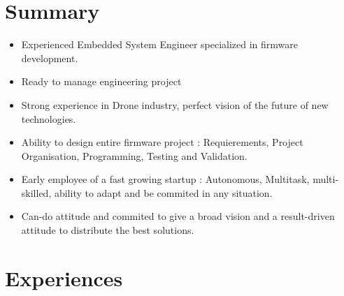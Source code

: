 \documentclass[a4paper]{friggeri-cv} %
\begin{document}
\section{Summary}
\begin{itemize}
\item Experienced Embedded System Engineer specialized in firmware development.
\item Ready to manage engineering project
\item Strong experience in Drone industry, perfect vision of the future of new technologies. 
\item Ability to design entire firmware project : Requierements, Project Organisation, Programming, Testing and Validation.
\item Early employee of a fast growing startup : Autonomous, Multitask, multi-skilled, ability to adapt and be commited in any situation.
\item Can-do attitude and commited to give a broad vision and a result-driven attitude to distribute the best solutions.
\end{itemize}



\section{Experiences}
\end{document}
